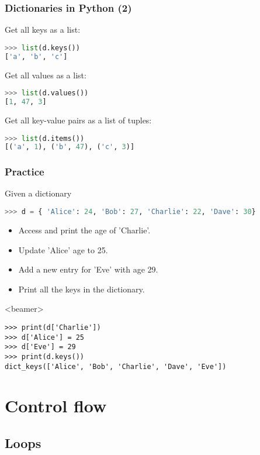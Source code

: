 \begin{frame}[fragile]
  \frametitle{Dictionaries in Python (2)}
  Get all keys as a list:
  \begin{lstlisting}[language=Python,numbers=none]
>>> list(d.keys())
['a', 'b', 'c']
  \end{lstlisting}
  Get all values as a list:
  \begin{lstlisting}[language=Python,numbers=none]
>>> list(d.values())
[1, 47, 3]
  \end{lstlisting}
  Get all key-value pairs as a list of tuples:
  \begin{lstlisting}[language=Python,numbers=none]
>>> list(d.items())
[('a', 1), ('b', 47), ('c', 3)]
  \end{lstlisting}
\end{frame}

\begin{frame}[fragile,label=practice_dictionary]
  \frametitle{Practice}
  Given a dictionary
  \begin{lstlisting}[language=Python,numbers=none]
>>> d = { 'Alice': 24, 'Bob': 27, 'Charlie': 22, 'Dave': 30}
  \end{lstlisting}
  \begin{itemize}
   \item Access and print the age of 'Charlie'.
   \item Update 'Alice' age to 25.
   \item Add a new entry for 'Eve' with age 29.
   \item Print all the keys in the dictionary.
  \end{itemize}\pause
  \begin{onlyenv}<beamer>
    \begin{lstlisting}[]
>>> print(d['Charlie'])
>>> d['Alice'] = 25
>>> d['Eve'] = 29
>>> print(d.keys())
dict_keys(['Alice', 'Bob', 'Charlie', 'Dave', 'Eve'])
    \end{lstlisting}
  \end{onlyenv}
 \end{frame}

 \section{Control flow}
 \subsection{Loops}
 
